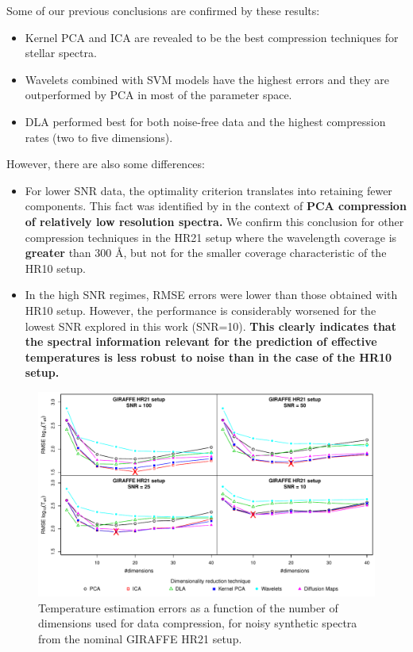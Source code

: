 \documentclass[a4paper,fleqn,usenatbib]{mnras}
\begin{document}
{{{Some of our previous conclusions are confirmed by these results:
\begin{itemize}
\item Kernel PCA and ICA are revealed to be the best compression 
	techniques for stellar spectra.  
\item Wavelets combined with SVM models have the highest errors and 
	they are outperformed by PCA in most of the parameter space.  
\item DLA performed best for both noise-free data and the highest 
	compression rates (two to five dimensions).
\end{itemize}

However, there are also some differences: 
\begin{itemize}
\item For lower SNR data, the optimality criterion translates into
	retaining fewer components. This fact was identified by 
	\cite{Bailer-Jones1998} in the context of {\bf PCA compression of 
		relatively low resolution spectra.} 
	We confirm this conclusion for other compression 
	techniques in the HR21 setup where the wavelength coverage is 
	{\bf greater} than 300 {\AA}, but not for the smaller 
	coverage characteristic of the HR10 setup.
\item In the high SNR regimes, RMSE errors were lower than those 
	obtained with HR10 setup. However, the performance is 
	considerably worsened for the lowest SNR explored in this work 
	(SNR=10). {\bf This clearly indicates that the spectral information 
		relevant for the prediction of effective temperatures is less 
		robust to noise than in the case of the HR10 setup.}
\end{itemize}


\begin{figure}
\centering\includegraphics[width=\textwidth]{flamesHR21_Teff_log_BestSVM_N-RMSE_test.pdf}
\caption{Temperature estimation errors as a function of the number of
  dimensions used for data compression, for noisy synthetic
  spectra from the nominal GIRAFFE HR21 setup.}
\label{fig:02hr21}
\end{figure}


}}}
\end{document}
